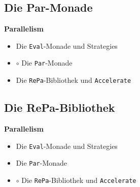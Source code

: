 \documentclass{beamer}
\begin{document}

\subsection{Die Par-Monade}

\begin{frame}[fragile]

\begin{center}
\Large
\textbf{Parallelism}\normalsize\bigskip
\begin{itemize}
\item Die \texttt{Eval}-Monade und Strategies
\item $\circ$ Die \texttt{Par}-Monade
\item Die \texttt{RePa}-Bibliothek und \texttt{Accelerate}
\end{itemize}
\end{center}

\end{frame}


\subsection{Die RePa-Bibliothek}

\begin{frame}[fragile]

\begin{center}
\Large
\textbf{Parallelism}\normalsize\bigskip
\begin{itemize}
\item Die \texttt{Eval}-Monade und Strategies
\item Die \texttt{Par}-Monade
\item $\circ$ Die \texttt{RePa}-Bibliothek und \texttt{Accelerate}
\end{itemize}
\end{center}

\end{frame}

\end{document}
